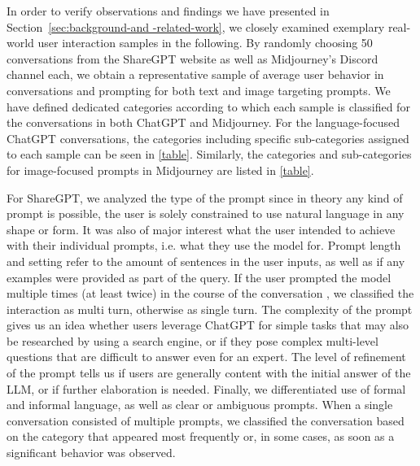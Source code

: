 In order to verify observations and findings we have presented in Section~\ref{sec:background-and
-related-work},
we closely examined exemplary real-world user interaction samples in the following.
By randomly choosing 50 conversations from the ShareGPT website as well as Midjourney's Discord
channel each, we obtain a representative sample of average user behavior in conversations and
prompting for both text and image targeting prompts.
We have defined dedicated categories according to which each sample is classified for the
conversations in both ChatGPT and Midjourney.
For the language-focused ChatGPT conversations, the categories including specific sub-categories assigned to each sample can be seen in \ref{table}.
Similarly, the categories and sub-categories for image-focused prompts in Midjourney are listed
in \ref{table}.

For ShareGPT, we analyzed the type of the prompt since in theory any kind of prompt is possible,
the user is solely constrained to use natural language in any shape or form.
It was also of major interest what the user intended to achieve with their individual prompts,
i.e. what they use the model for.
Prompt length and setting refer to the amount of sentences in the user inputs, as well as if any
examples were provided as part of the query.
If the user prompted the model multiple times (at least twice) in the course of the conversation
, we classified the interaction as multi turn, otherwise as single turn.
The complexity of the prompt gives us an idea whether users leverage ChatGPT for simple tasks
that may also be researched by using a search engine, or if they pose complex multi-level
questions that are difficult to answer even for an expert.
The level of refinement of the prompt tells us if users are generally content with the initial
answer of the LLM, or if further elaboration is needed.
Finally, we differentiated use of formal and informal language, as well as clear or ambiguous
prompts.
When a single conversation consisted of multiple prompts, we classified the conversation
based on the category that appeared most frequently or, in some cases, as soon as a significant
behavior was observed.

